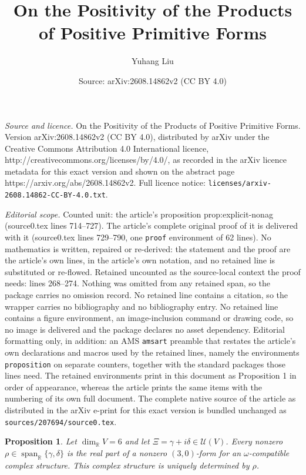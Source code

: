\documentclass[10pt,a4paper]{amsart}
\title{On the Positivity of the Products of Positive Primitive Forms}
\author{Yuhang Liu}
\date{Source: arXiv:2608.14862v2 (CC BY 4.0)}
\newtheorem{proposition}{Proposition}
\newcommand{\R}{\mathbb R}
\newcommand{\Span}{\operatorname{span}}
\newcommand{\U}{\mathcal U}
\begin{document}
\maketitle

\noindent\emph{Source and licence.} On the Positivity of the Products of Positive Primitive Forms. Version arXiv:2608.14862v2 (CC BY 4.0), distributed by arXiv under the Creative Commons Attribution 4.0 International licence, http://creativecommons.org/licenses/by/4.0/, as recorded in the arXiv licence metadata for this exact version and shown on the abstract page https://arxiv.org/abs/2608.14862v2. Full licence notice: \texttt{licenses/arxiv-2608.14862-CC-BY-4.0.txt}.\par\smallskip

\noindent\textit{Editorial scope.} Counted unit: the article's proposition prop:explicit-nonag (source0.tex lines 714--727). The article's complete original proof of it is delivered with it (source0.tex lines 729--790, one \texttt{proof} environment of 62 lines). No mathematics is written, repaired or re-derived: the statement and the proof are the article's own lines, in the article's own notation, and no retained line is substituted or re-flowed.  Retained uncounted as the source-local context the proof needs: lines 268--274.  Nothing was omitted from any retained span, so the package carries no omission record.  No retained line contains a citation, so the wrapper carries no bibliography and no bibliography entry.  No retained line contains a figure environment, an image-inclusion command or drawing code, so no image is delivered and the package declares no asset dependency.  Editorial formatting only, in addition: an AMS \texttt{amsart} preamble that restates the article's own declarations and macros used by the retained lines, namely the environments \texttt{proposition} on separate counters, together with the standard packages those lines need.  The retained environments print in this document as Proposition 1 in order of appearance, whereas the article prints the same items with the numbering of its own full document.  The complete native source of the article as distributed in the arXiv e-print for this exact version is bundled unchanged as \texttt{sources/207694/source0.tex}.
\begin{proposition}\label{prop:stable-real-parts}
Let $\dim_{\R}V=6$ and let
$\Xi=\gamma+i\delta\in\U(V)$.  Every nonzero
$\rho\in\Span_{\R}\{\gamma,\delta\}$ is the real part of a nonzero
$(3,0)$-form for an $\omega$-compatible complex structure.  This complex
structure is uniquely determined by $\rho$.
\end{proposition}
\end{document}
